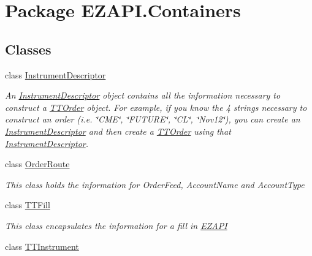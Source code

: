 \hypertarget{namespace_e_z_a_p_i_1_1_containers}{\section{Package E\-Z\-A\-P\-I.\-Containers}
\label{namespace_e_z_a_p_i_1_1_containers}
}
\subsection*{Classes}
\begin{DoxyCompactItemize}
\item 
class \hyperlink{class_e_z_a_p_i_1_1_containers_1_1_instrument_descriptor}{Instrument\-Descriptor}
\begin{DoxyCompactList}\small\item\em An \hyperlink{class_e_z_a_p_i_1_1_containers_1_1_instrument_descriptor}{Instrument\-Descriptor} object contains all the information necessary to construct a \hyperlink{class_e_z_a_p_i_1_1_containers_1_1_t_t_order}{T\-T\-Order} object. For example, if you know the 4 strings necessary to construct an order (i.\-e. \char`\"{}\-C\-M\-E\char`\"{}, \char`\"{}\-F\-U\-T\-U\-R\-E\char`\"{}, \char`\"{}\-C\-L\char`\"{}, \char`\"{}\-Nov12\char`\"{}), you can create an \hyperlink{class_e_z_a_p_i_1_1_containers_1_1_instrument_descriptor}{Instrument\-Descriptor} and then create a \hyperlink{class_e_z_a_p_i_1_1_containers_1_1_t_t_order}{T\-T\-Order} using that \hyperlink{class_e_z_a_p_i_1_1_containers_1_1_instrument_descriptor}{Instrument\-Descriptor}. \end{DoxyCompactList}\item 
class \hyperlink{class_e_z_a_p_i_1_1_containers_1_1_order_route}{Order\-Route}
\begin{DoxyCompactList}\small\item\em This class holds the information for Order\-Feed, Account\-Name and Account\-Type \end{DoxyCompactList}\item 
class \hyperlink{class_e_z_a_p_i_1_1_containers_1_1_t_t_fill}{T\-T\-Fill}
\begin{DoxyCompactList}\small\item\em This class encapsulates the information for a fill in \hyperlink{namespace_e_z_a_p_i}{E\-Z\-A\-P\-I} \end{DoxyCompactList}\item 
class \hyperlink{class_e_z_a_p_i_1_1_containers_1_1_t_t_instrument}{T\-T\-Instrument}

\end{DoxyCompactItemize}
